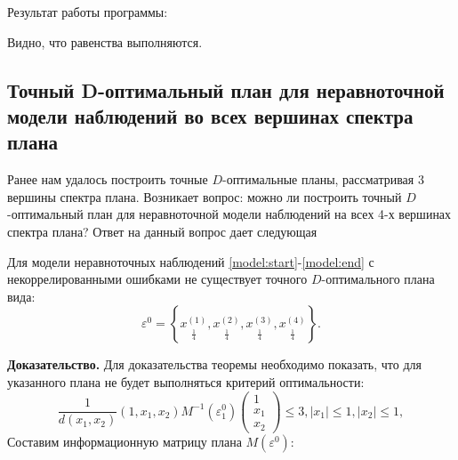 	Результат работы программы:
	
	
	Видно, что равенства выполняются.
	
\subsection {Точный D-оптимальный план для неравноточной модели наблюдений во всех вершинах спектра плана}
	Ранее нам удалось построить точные $D$-оптимальные планы, рассматривая 3 вершины спектра плана. Возникает вопрос: можно ли построить точный $D$-оптимальный план для неравноточной модели наблюдений на всех 4-х вершинах спектра плана? Ответ на данный вопрос дает следующая
	\begin{theorem} \label{theorem-4p}
		Для модели неравноточных наблюдений \eqref{model:start}-\eqref{model:end} с некоррелированными ошибками
		не существует точного $D$-оптимального плана вида:
		\begin{equation}
			\varepsilon^{0} = \left \{
				\underset{\frac 1 4} {x^{(1)}},
				\underset{\frac 1 4} {x^{(2)}},
				\underset{\frac 1 4} {x^{(3)}},
				\underset{\frac 1 4} {x^{(4)}}
			\right \}.
		\end{equation}	 
	\end{theorem}
	\textbf{Доказательство.}
	Для доказательства теоремы необходимо показать, что для указанного плана не будет выполняться критерий оптимальности:
	\begin{equation}\label{theorem-4p:criterion}
		\frac 1 {d(x_1, x_2)}
			(1, x_1, x_2)
			M^{-1}(\varepsilon_1^0)
			\begin{pmatrix}1 \\ x_1 \\ x_2 \end{pmatrix} \le 3,
			|x_1| \le 1, |x_2| \le 1,
	\end{equation}
	Составим информационную матрицу плана $M(\varepsilon^0)$:
